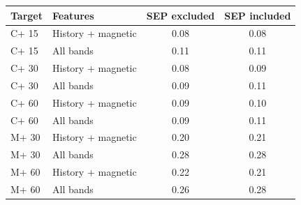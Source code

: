 \begin{tabular}{llcc}
\toprule
Target & Features & SEP excluded & SEP included \\
\midrule
C+ 15 & History + magnetic & 0.08 & 0.08 \\
C+ 15 & All bands & 0.11 & 0.11 \\
C+ 30 & History + magnetic & 0.08 & 0.09 \\
C+ 30 & All bands & 0.09 & 0.11 \\
C+ 60 & History + magnetic & 0.09 & 0.10 \\
C+ 60 & All bands & 0.09 & 0.11 \\
M+ 30 & History + magnetic & 0.20 & 0.21 \\
M+ 30 & All bands & 0.28 & 0.28 \\
M+ 60 & History + magnetic & 0.22 & 0.21 \\
M+ 60 & All bands & 0.26 & 0.28 \\
\bottomrule
\end{tabular}
